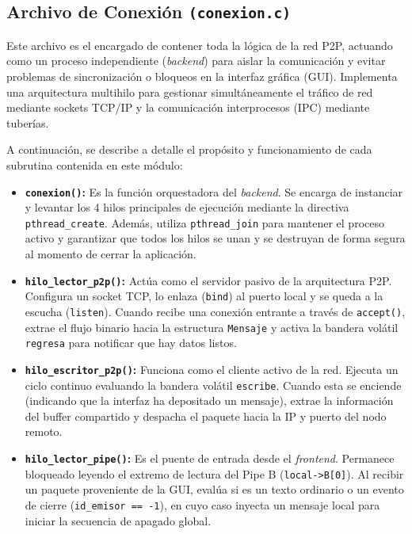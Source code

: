 \subsection{Archivo de Conexión \texttt{(conexion.c)}}
Este archivo es el encargado de contener toda la lógica de la red P2P, actuando como un proceso independiente (\textit{backend}) para aislar la comunicación y evitar problemas de sincronización o bloqueos en la interfaz gráfica (GUI). Implementa una arquitectura multihilo para gestionar simultáneamente el tráfico de red mediante sockets TCP/IP y la comunicación interprocesos (IPC) mediante tuberías.

A continuación, se describe a detalle el propósito y funcionamiento de cada subrutina contenida en este módulo:

\begin{itemize}
    \item \textbf{\texttt{conexion()}:} Es la función orquestadora del \textit{backend}. Se encarga de instanciar y levantar los 4 hilos principales de ejecución mediante la directiva \texttt{pthread\_create}. Además, utiliza \texttt{pthread\_join} para mantener el proceso activo y garantizar que todos los hilos se unan y se destruyan de forma segura al momento de cerrar la aplicación.
    
    \item \textbf{\texttt{hilo\_lector\_p2p()}:} Actúa como el servidor pasivo de la arquitectura P2P. Configura un socket TCP, lo enlaza (\texttt{bind}) al puerto local y se queda a la escucha (\texttt{listen}). Cuando recibe una conexión entrante a través de \texttt{accept()}, extrae el flujo binario hacia la estructura \texttt{Mensaje} y activa la bandera volátil \texttt{regresa} para notificar que hay datos listos.
    
    \item \textbf{\texttt{hilo\_escritor\_p2p()}:} Funciona como el cliente activo de la red. Ejecuta un ciclo continuo evaluando la bandera volátil \texttt{escribe}. Cuando esta se enciende (indicando que la interfaz ha depositado un mensaje), extrae la información del buffer compartido y despacha el paquete hacia la IP y puerto del nodo remoto.
    
    \item \textbf{\texttt{hilo\_lector\_pipe()}:} Es el puente de entrada desde el \textit{frontend}. Permanece bloqueado leyendo el extremo de lectura del Pipe B (\texttt{local->B[0]}). Al recibir un paquete proveniente de la GUI, evalúa si es un texto ordinario o un evento de cierre (\texttt{id\_emisor == -1}), en cuyo caso inyecta un mensaje local para iniciar la secuencia de apagado global.
    

\end{itemize}

